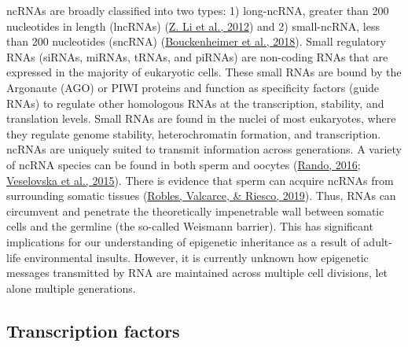 \documentclass[12pt,twoside]{reedthesis}
\begin{document}
ncRNAs are broadly classified into two types: 1) long-ncRNA, greater
than 200 nucleotides in length (lncRNAs) (\protect\hyperlink{ref-li2012}{Z. Li et al., 2012}) and 2) small-ncRNA,
less than 200 nucleotides (sncRNA) (\protect\hyperlink{ref-bouckenheimer2018}{Bouckenheimer et al., 2018}). Small
regulatory RNAs (siRNAs, miRNAs, tRNAs, and piRNAs) are non-coding RNAs
that are expressed in the majority of eukaryotic cells. These small RNAs
are bound by the Argonaute (AGO) or PIWI proteins and function as
specificity factors (guide RNAs) to regulate other homologous RNAs at
the transcription, stability, and translation levels. Small RNAs are
found in the nuclei of most eukaryotes, where they regulate genome
stability, heterochromatin formation, and transcription. ncRNAs are
uniquely suited to transmit information across generations. A variety of
ncRNA species can be found in both sperm and oocytes (\protect\hyperlink{ref-rando2016}{Rando, 2016}; \protect\hyperlink{ref-veselovska2015}{Veselovska et al., 2015}). There is evidence that sperm can acquire ncRNAs from
surrounding somatic tissues (\protect\hyperlink{ref-robles2019}{Robles, Valcarce, \& Riesco, 2019}). Thus, RNAs can circumvent and
penetrate the theoretically impenetrable wall between somatic cells and
the germline (the so-called Weismann barrier). This has significant
implications for our understanding of epigenetic inheritance as a result
of adult-life environmental insults. However, it is currently unknown
how epigenetic messages transmitted by RNA are maintained across
multiple cell divisions, let alone multiple generations.

\hypertarget{transcription-factors}{%
\subsection*{Transcription factors}\label{transcription-factors}}
\end{document}

